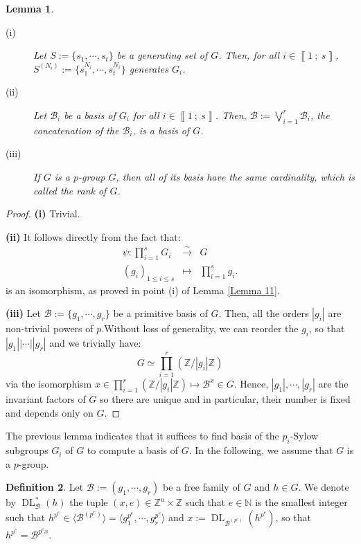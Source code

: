 \documentclass[a4paper,10pt]{report}
\theoremstyle{definition}
\newtheorem{Definition}{Definition}[chapter]
\theoremstyle{plain}
\newtheorem{Lemma}[Definition]{Lemma}
\theoremstyle{definition}
\newcommand{\N}{\mathbb{N}}
\newcommand{\Z}{\mathbb{Z}}
\newcommand{\m}[1]{\mathcal{#1}}
\renewcommand{\i}[2]{\left\llbracket #1~;~#2\right\rrbracket}
\renewcommand{\(}{\left(}
\renewcommand{\)}{\right)}
\DeclareMathOperator{\DL}{DL}
\begin{document}
\begin{Lemma}\label{Lemma 12}
\begin{description}
\item[(i)] Let $S:=\{s_1,\cdots, s_t\}$ be a generating set of $G$.  Then, for all $i\in\i{1}{s}$, $S^{(N_i)}:=\{s_1^{N_i},\cdots, s_t^{N_i}\}$ generates $G_i$.

\item[(ii)] Let $\m{B}_i$ be a basis of $G_i$ for all $i\in\i{1}{s}$. Then, $\m{B}:=\bigvee_{i=1}^r\m{B}_i$, the concatenation of the $\m{B}_i$, is a basis of $G$.

\item[(iii)] If $G$ is a $p$-group $G$, then all of its basis have the same cardinality, which is called the \emph{rank} of $G$.
\end{description}
\end{Lemma}

\begin{proof}
\textbf{(i)} Trivial.

\textbf{(ii)} It follows directly from the fact that:
\[\begin{array}{rcl}
\psi : \prod_{i=1}^s G_i &\overset{\sim}{\longrightarrow}& G\\
(g_i)_{1\leq i\leq s} &\longmapsto & \prod_{i=1}^s g_i.
\end{array}\]
is an isomorphism, as proved in point (i) of Lemma \ref{Lemma 11}.

\textbf{(iii)} Let $\m{B}:=\{g_1,\cdots, g_r\}$ be a primitive basis of $G$. Then, all the orders $|g_i|$ are non-trivial powers of $p$.Without loss of generality, we can reorder the $g_i$, so that $|g_1||\cdots||g_r|$ and we trivially have:
\[G\simeq \prod_{i=1}^r (\Z/|g_i|\Z)\]
via the isomorphism $x\in\prod_{i=1}^r (\Z/|g_i|\Z)\longmapsto\m{B}^x\in G$.  Hence, $|g_1|,\cdots,|g_r|$ are the invariant factors of $G$ so there are unique and in particular, their number is fixed and depends only on $G$.
\end{proof}

The previous lemma indicates that it suffices to find basis of the $p_i$-Sylow subgroups $G_i$ of $G$ to compute a basis of $G$. In the following, we assume that $G$ is a $p$-group.

\begin{Definition}
Let $\m{B}:=(g_1,\cdots, g_r)$ be a free family of $G$ and $h\in G$. We denote by $\DL_{\m{B}}^*(h)$ the tuple $(x,e)\in\Z^u\times\Z$ such that $e\in\N$ is the smallest integer such that $h^{p^e}\in\langle\m{B}^{(p^e)}\rangle=\langle g_1^{p^e},\cdots, g_r^{p^e}\rangle$ and $x:=\DL_{\m{B}^{(p^e)}}(h^{p^e})$, so that $h^{p^e}=\m{B}^{p^e x}$. 
\end{Definition}
\end{document}
